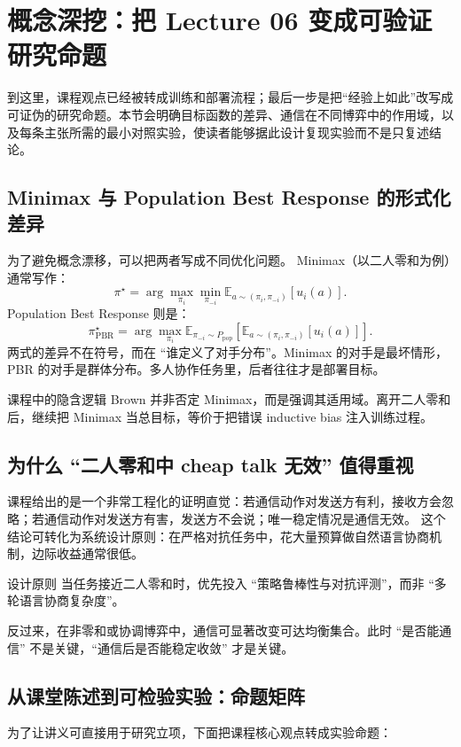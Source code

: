 \section{概念深挖：把 Lecture 06 变成可验证研究命题}

到这里，课程观点已经被转成训练和部署流程；最后一步是把“经验上如此”改写成可证伪的研究命题。本节会明确目标函数的差异、通信在不同博弈中的作用域，以及每条主张所需的最小对照实验，使读者能够据此设计复现实验而不是只复述结论。

\subsection{Minimax 与 Population Best Response 的形式化差异}
为了避免概念漂移，可以把两者写成不同优化问题。
Minimax（以二人零和为例）通常写作：
\[
\pi^\star = \arg\max_{\pi_i}\min_{\pi_{-i}} \mathbb{E}_{a\sim(\pi_i,\pi_{-i})}[u_i(a)].
\]
Population Best Response 则是：
\[
\pi^\star_{\text{PBR}}=\arg\max_{\pi_i}\mathbb{E}_{\pi_{-i}\sim P_{\text{pop}}}\left[\mathbb{E}_{a\sim(\pi_i,\pi_{-i})}[u_i(a)]\right].
\]
两式的差异不在符号，而在 ``谁定义了对手分布''。Minimax 的对手是最坏情形，PBR 的对手是群体分布。多人协作任务里，后者往往才是部署目标。

\begin{knowledgebox}{课程中的隐含逻辑}
Brown 并非否定 Minimax，而是强调其适用域。离开二人零和后，继续把 Minimax 当总目标，等价于把错误 inductive bias 注入训练过程。
\end{knowledgebox}

\subsection{为什么 ``二人零和中 cheap talk 无效'' 值得重视}
课程给出的是一个非常工程化的证明直觉：若通信动作对发送方有利，接收方会忽略；若通信动作对发送方有害，发送方不会说；唯一稳定情况是通信无效。
这个结论可转化为系统设计原则：在严格对抗任务中，花大量预算做自然语言协商机制，边际收益通常很低。

\begin{importantbox}{设计原则}
当任务接近二人零和时，优先投入 ``策略鲁棒性与对抗评测''，而非 ``多轮语言协商复杂度''。
\end{importantbox}

反过来，在非零和或协调博弈中，通信可显著改变可达均衡集合。此时 ``是否能通信'' 不是关键，``通信后是否能稳定收敛'' 才是关键。

\subsection{从课堂陈述到可检验实验：命题矩阵}
为了让讲义可直接用于研究立项，下面把课程核心观点转成实验命题：

